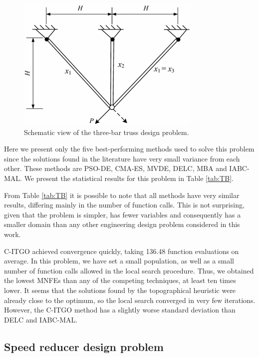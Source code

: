 \begin{figure}[h]
\begin{center}
\includegraphics[scale=0.5]{Imgs/TB.png}
\end{center}
\captionsetup{justification=centering}
\caption{Schematic view of the three-bar truss design problem.}\label{fig:TB}
\end{figure}


Here we present only the five best-performing methods used to solve this problem since the solutions found in the literature have very small variance from each other. These methods are PSO-DE, CMA-ES, MVDE, DELC, MBA and IABC-MAL. We present the statistical results for this problem in Table \ref{tab:TB}.



From Table \ref{tab:TB} it is possible to note that all methods have very similar results, differing mainly in the number of function calls. This is not surprising, given that the problem is simpler, has fewer variables and consequently has a smaller domain than any other engineering design problem considered in this work.

C-ITGO achieved convergence quickly, taking 136.48 function evaluations on average. In this problem, we have set a small population, as well as a small number of function calls allowed in the local search procedure. Thus, we obtained the lowest MNFEs than any of the competing techniques, at least ten times lower. It seems that the solutions found by the topographical heuristic were already close to the optimum, so the local search converged in very few iterations. However, the C-ITGO method has a slightly worse standard deviation than DELC and IABC-MAL.



\subsection{Speed reducer design problem}

